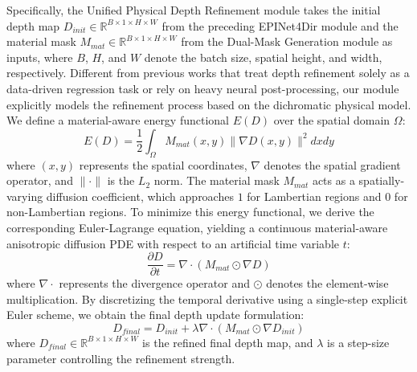 \documentclass[lettersize,journal]{IEEEtran}
\begin{document}
Specifically, the Unified Physical Depth Refinement module takes the initial depth map $D_{init} \in \mathbb{R}^{B \times 1 \times H \times W}$ from the preceding EPINet4Dir module and the material mask $M_{mat} \in \mathbb{R}^{B \times 1 \times H \times W}$ from the Dual-Mask Generation module as inputs, where $B$, $H$, and $W$ denote the batch size, spatial height, and width, respectively. Different from previous works that treat depth refinement solely as a data-driven regression task or rely on heavy neural post-processing, our module explicitly models the refinement process based on the dichromatic physical model. We define a material-aware energy functional $E(D)$ over the spatial domain $\Omega$:
\begin{equation}
\label{eq:eq17}
E(D) = \frac{1}{2} \int_{\Omega} M_{mat}(x,y) \|\nabla D(x,y)\|^2 dx dy
\end{equation}
where $(x,y)$ represents the spatial coordinates, $\nabla$ denotes the spatial gradient operator, and $\|\cdot\|$ is the $L_2$ norm. The material mask $M_{mat}$ acts as a spatially-varying diffusion coefficient, which approaches $1$ for Lambertian regions and $0$ for non-Lambertian regions. To minimize this energy functional, we derive the corresponding Euler-Lagrange equation, yielding a continuous material-aware anisotropic diffusion PDE with respect to an artificial time variable $t$:
\begin{equation}
\label{eq:eq18}
\frac{\partial D}{\partial t} = \nabla \cdot (M_{mat} \odot \nabla D)
\end{equation}
where $\nabla \cdot$ represents the divergence operator and $\odot$ denotes the element-wise multiplication. By discretizing the temporal derivative using a single-step explicit Euler scheme, we obtain the final depth update formulation:
\begin{equation}
\label{eq:eq19}
D_{final} = D_{init} + \lambda \nabla \cdot (M_{mat} \odot \nabla D_{init})
\end{equation}
where $D_{final} \in \mathbb{R}^{B \times 1 \times H \times W}$ is the refined final depth map, and $\lambda$ is a step-size parameter controlling the refinement strength. 
\end{document}
